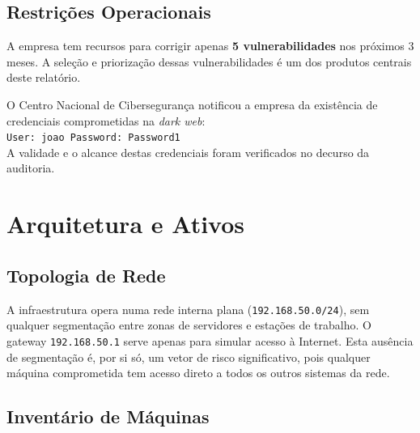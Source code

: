 \documentclass[12pt, a4paper]{report}
\begin{document}
\section{Restrições Operacionais}

\begin{notebox}
A empresa tem recursos para corrigir apenas \textbf{5 vulnerabilidades} nos próximos 3 meses.
A seleção e priorização dessas vulnerabilidades é um dos produtos centrais deste relatório.
\end{notebox}

\vspace{0.6em}

\begin{alertbox}
O Centro Nacional de Cibersegurança notificou a empresa da existência de credenciais
comprometidas na \textit{dark web}:\\
\texttt{User: joao \quad Password: Password1}\\
A validade e o alcance destas credenciais foram verificados no decurso da auditoria.
\end{alertbox}

\chapter{Arquitetura e Ativos}

\section{Topologia de Rede}

A infraestrutura opera numa rede interna plana (\texttt{192.168.50.0/24}), sem qualquer
segmentação entre zonas de servidores e estações de trabalho. O gateway \texttt{192.168.50.1}
serve apenas para simular acesso à Internet. Esta ausência de segmentação é, por si só, um
vetor de risco significativo, pois qualquer máquina comprometida tem acesso direto a todos
os outros sistemas da rede.

\section{Inventário de Máquinas}
\end{document}
